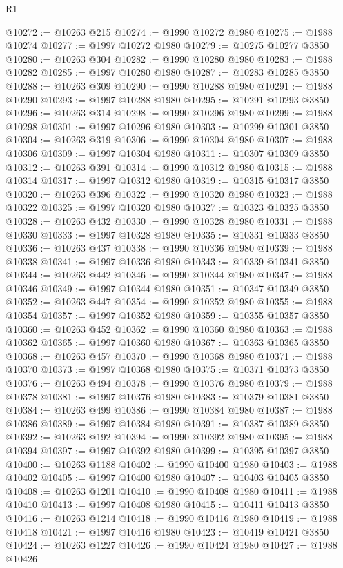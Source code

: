 \begin{lexlean}{R1}
\begin{coremodule}
@10272 := @10263 @215
@10274 := @1990 @10272 @1980
@10275 := @1988 @10274
@10277 := @1997 @10272 @1980
@10279 := @10275 @10277 @3850
@10280 := @10263 @304
@10282 := @1990 @10280 @1980
@10283 := @1988 @10282
@10285 := @1997 @10280 @1980
@10287 := @10283 @10285 @3850
@10288 := @10263 @309
@10290 := @1990 @10288 @1980
@10291 := @1988 @10290
@10293 := @1997 @10288 @1980
@10295 := @10291 @10293 @3850
@10296 := @10263 @314
@10298 := @1990 @10296 @1980
@10299 := @1988 @10298
@10301 := @1997 @10296 @1980
@10303 := @10299 @10301 @3850
@10304 := @10263 @319
@10306 := @1990 @10304 @1980
@10307 := @1988 @10306
@10309 := @1997 @10304 @1980
@10311 := @10307 @10309 @3850
@10312 := @10263 @391
@10314 := @1990 @10312 @1980
@10315 := @1988 @10314
@10317 := @1997 @10312 @1980
@10319 := @10315 @10317 @3850
@10320 := @10263 @396
@10322 := @1990 @10320 @1980
@10323 := @1988 @10322
@10325 := @1997 @10320 @1980
@10327 := @10323 @10325 @3850
@10328 := @10263 @432
@10330 := @1990 @10328 @1980
@10331 := @1988 @10330
@10333 := @1997 @10328 @1980
@10335 := @10331 @10333 @3850
@10336 := @10263 @437
@10338 := @1990 @10336 @1980
@10339 := @1988 @10338
@10341 := @1997 @10336 @1980
@10343 := @10339 @10341 @3850
@10344 := @10263 @442
@10346 := @1990 @10344 @1980
@10347 := @1988 @10346
@10349 := @1997 @10344 @1980
@10351 := @10347 @10349 @3850
@10352 := @10263 @447
@10354 := @1990 @10352 @1980
@10355 := @1988 @10354
@10357 := @1997 @10352 @1980
@10359 := @10355 @10357 @3850
@10360 := @10263 @452
@10362 := @1990 @10360 @1980
@10363 := @1988 @10362
@10365 := @1997 @10360 @1980
@10367 := @10363 @10365 @3850
@10368 := @10263 @457
@10370 := @1990 @10368 @1980
@10371 := @1988 @10370
@10373 := @1997 @10368 @1980
@10375 := @10371 @10373 @3850
@10376 := @10263 @494
@10378 := @1990 @10376 @1980
@10379 := @1988 @10378
@10381 := @1997 @10376 @1980
@10383 := @10379 @10381 @3850
@10384 := @10263 @499
@10386 := @1990 @10384 @1980
@10387 := @1988 @10386
@10389 := @1997 @10384 @1980
@10391 := @10387 @10389 @3850
@10392 := @10263 @192
@10394 := @1990 @10392 @1980
@10395 := @1988 @10394
@10397 := @1997 @10392 @1980
@10399 := @10395 @10397 @3850
@10400 := @10263 @1188
@10402 := @1990 @10400 @1980
@10403 := @1988 @10402
@10405 := @1997 @10400 @1980
@10407 := @10403 @10405 @3850
@10408 := @10263 @1201
@10410 := @1990 @10408 @1980
@10411 := @1988 @10410
@10413 := @1997 @10408 @1980
@10415 := @10411 @10413 @3850
@10416 := @10263 @1214
@10418 := @1990 @10416 @1980
@10419 := @1988 @10418
@10421 := @1997 @10416 @1980
@10423 := @10419 @10421 @3850
@10424 := @10263 @1227
@10426 := @1990 @10424 @1980
@10427 := @1988 @10426

\end{coremodule}
\end{lexlean}
